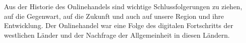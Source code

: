Aus der Historie des Onlinehandels sind wichtige Schlussfolgerungen zu ziehen, auf die Gegenwart, auf die Zukunft und auch auf unsere Region und ihre Entwicklung. Der Onlinehandel war eine Folge des digitalen Fortschritts der westlichen Länder und der Nachfrage der Allgemeinheit in diesen Ländern. 
